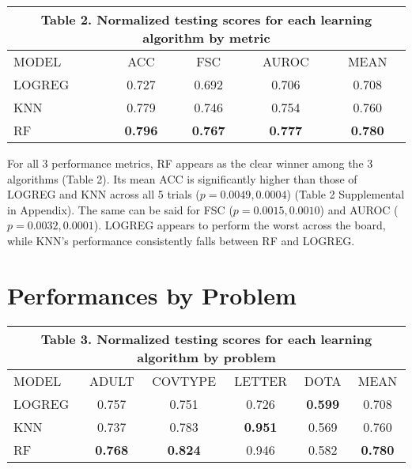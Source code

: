 \documentclass[twoside,11pt]{article}
\begin{document}
\begin{table}[htb]
\centering
\begin{tabular}{lcccc}
\multicolumn{5}{c}{Table 2. Normalized testing scores for each learning algorithm by metric}                                                      \\ \hline
\multicolumn{1}{|l|}{MODEL}  & ACC            & FSC            & \multicolumn{1}{c|}{AUROC}          & \multicolumn{1}{c|}{MEAN}           \\ \hline
\multicolumn{1}{|l|}{LOGREG} & 0.727          & 0.692          & \multicolumn{1}{c|}{0.706}          & \multicolumn{1}{c|}{0.708}          \\
\multicolumn{1}{|l|}{KNN}    & 0.779          & 0.746          & \multicolumn{1}{c|}{0.754}          & \multicolumn{1}{c|}{0.760}          \\
\multicolumn{1}{|l|}{RF}     & \textbf{0.796} & \textbf{0.767} & \multicolumn{1}{c|}{\textbf{0.777}} & \multicolumn{1}{c|}{\textbf{0.780}} \\ \hline
\end{tabular}
\end{table}

 For all 3 performance metrics, RF appears as the clear winner among the 3 algorithms (Table 2). Its mean ACC is significantly higher than those of LOGREG and KNN across all 5 trials ($p = 0.0049, 0.0004$) (Table 2 Supplemental in Appendix). The same can be said for FSC ($p = 0.0015, 0.0010$) and AUROC ($p = 0.0032, 0.0001$). LOGREG appears to perform the worst across the board, while KNN's performance consistently falls between RF and LOGREG.

\section{Performances by Problem}

\begin{table}[htb]
\centering
\begin{tabular}{lccccc}
\multicolumn{6}{c}{Table 3. Normalized testing scores for each learning algorithm by problem}                                             \\ \hline
\multicolumn{1}{|l|}{MODEL}  & ADULT          & COVTYPE        & LETTER         & \multicolumn{1}{c|}{DOTA}           & \multicolumn{1}{c|}{MEAN}           \\ \hline
\multicolumn{1}{|l|}{LOGREG} & 0.757          & 0.751          & 0.726          & \multicolumn{1}{c|}{\textbf{0.599}} & \multicolumn{1}{c|}{0.708}          \\
\multicolumn{1}{|l|}{KNN}    & 0.737          & 0.783          & \textbf{0.951} & \multicolumn{1}{c|}{0.569}          & \multicolumn{1}{c|}{0.760}          \\
\multicolumn{1}{|l|}{RF}     & \textbf{0.768} & \textbf{0.824} & 0.946          & \multicolumn{1}{c|}{0.582}          & \multicolumn{1}{c|}{\textbf{0.780}} \\ \hline
\end{tabular}
\end{table}
\end{document}
